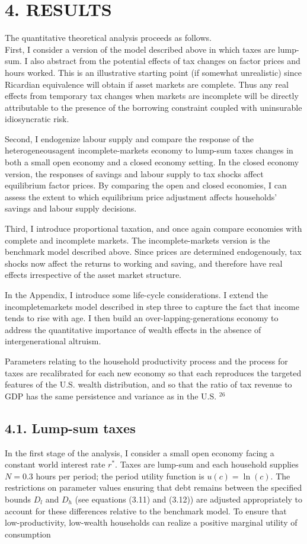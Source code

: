 \documentclass[11pt]{article}
\begin{document}
\section*{4. RESULTS}
The quantitative theoretical analysis proceeds as follows.\\
First, I consider a version of the model described above in which taxes are lump-sum. I also abstract from the potential effects of tax changes on factor prices and hours worked. This is an illustrative starting point (if somewhat unrealistic) since Ricardian equivalence will obtain if asset markets are complete. Thus any real effects from temporary tax changes when markets are incomplete will be directly attributable to the presence of the borrowing constraint coupled with uninsurable idiosyncratic risk.

Second, I endogenize labour supply and compare the response of the heterogeneousagent incomplete-markets economy to lump-sum taxes changes in both a small open economy and a closed economy setting. In the closed economy version, the responses of savings and labour supply to tax shocks affect equilibrium factor prices. By comparing the open and closed economies, I can assess the extent to which equilibrium price adjustment affects households’ savings and labour supply decisions.

Third, I introduce proportional taxation, and once again compare economies with complete and incomplete markets. The incomplete-markets version is the benchmark model described above. Since prices are determined endogenously, tax shocks now affect the returns to working and saving, and therefore have real effects irrespective of the asset market structure.

In the Appendix, I introduce some life-cycle considerations. I extend the incompletemarkets model described in step three to capture the fact that income tends to rise with age. I then build an over-lapping-generations economy to address the quantitative importance of wealth effects in the absence of intergenerational altruism.

Parameters relating to the household productivity process and the process for taxes are recalibrated for each new economy so that each reproduces the targeted features of the U.S. wealth distribution, and so that the ratio of tax revenue to GDP has the same persistence and variance as in the U.S. ${ }^{26}$

\subsection*{4.1. Lump-sum taxes}
In the first stage of the analysis, I consider a small open economy facing a constant world interest rate $r^{*}$. Taxes are lump-sum and each household supplies $N=0.3$ hours per period; the period utility function is $u(c)=\ln (c)$. The restrictions on parameter values ensuring that debt remains between the specified bounds $D_{l}$ and $D_{h}$ (see equations (3.11) and (3.12)) are adjusted appropriately to account for these differences relative to the benchmark model. To ensure that low-productivity, low-wealth households can realize a positive marginal utility of consumption
\end{document}
